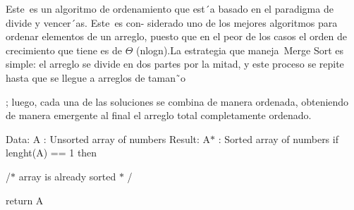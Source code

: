 \documentclass[12pt]{article}
\begin{document}
\vspace{\baselineskip}
\begin{adjustwidth}{0.07in}{0.05in}
\begin{justify}
{\fontsize{11pt}{13.2pt}\selectfont Este\  es un algoritmo  de ordenamiento que est´a basado  en el paradigma de divide y vencer´as. Este\  es con- siderado  uno de los mejores algoritmos  para  ordenar  elementos  de un arreglo,  puesto  que en el peor de los casos el orden de crecimiento  que tiene es de $ \Theta $ (nlogn).La estrategia que maneja\  Merge Sort  es simple:  el arreglo se divide en dos partes  por la mitad,  y este proceso se repite hasta  que se llegue a arreglos de taman˜o\par}
\end{justify}\par

\end{adjustwidth}

\begin{adjustwidth}{0.07in}{0.05in}
\begin{justify}
{\fontsize{11pt}{13.2pt}; luego, cada  una  de las soluciones se combina  de manera  ordenada, obteniendo  de manera  emergente  al final el arreglo total  completamente ordenado.\par}
\end{justify}\par

\end{adjustwidth}


\vspace{\baselineskip}
\begin{adjustwidth}{0.31in}{4.32in}
\begin{justify}
{\fontsize{11pt}{13.2pt}\selectfont Data: A : Unsorted  array  of numbers Result:  A$\ast$  : Sorted  array  of numbers if lenght(A)  == 1 then\par}
\end{justify}\par

\end{adjustwidth}

\begin{adjustwidth}{0.54in}{0.0in}
{\fontsize{11pt}{13.2pt}\selectfont /$\ast$  array  is already  sorted  $\ast$ /\par}\par

\end{adjustwidth}

\begin{adjustwidth}{0.54in}{0.0in}
{\fontsize{11pt}{13.2pt}\selectfont return  A\par}\par

\end{adjustwidth}
\end{document}

